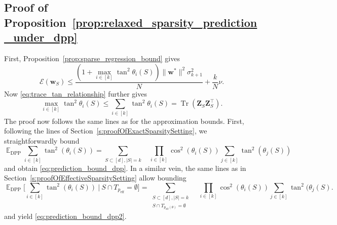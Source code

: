 \documentclass[twoside,11pt]{book}
\numberwithin{theorem}{chapter}
\numberwithin{definition}{chapter}
\numberwithin{proposition}{chapter}
\numberwithin{corollary}{chapter}
\numberwithin{example}{chapter}
\numberwithin{lemma}{chapter}
\numberwithin{assumption}{chapter}
\numberwithin{equation}{chapter}
\numberwithin{figure}{chapter}
\DeclareMathOperator{\Tr}{Tr}
\DeclareMathOperator{\DPP}{\mathrm{DPP}}
\DeclareMathOperator{\eff}{\mathrm{eff}}
\DeclareMathOperator{\Tran}{\intercal}
\DeclareMathOperator{\EX}{\mathbb{E}}
\begin{document}
\subsection{Proof of Proposition~\ref{prop:relaxed_sparsity_prediction_under_dpp}}
First, Proposition~\ref{prop:sparse_regression_bound} gives
\begin{equation}
    	\mathcal{E}(\bm{w}_{S})  \leq \frac{(1+\max\limits_{i \in [k]} \tan^{2}\theta_{i}(S))	\|\bm{w}^{*}\|^{2}\sigma_{k+1}^{2}}{N} + \frac{k}{N}\nu.
\end{equation}
Now \eqref{eq:trace_tan_relationship} further gives
\begin{equation}
	\max\limits_{i \in [k]} \tan^{2}\theta_{i}(S) \leq \sum\limits_{i \in [k]} \tan^{2}\theta_{i}(S) = \Tr(\bm{Z}_{S}^{}\bm{Z}_{S}	^{\Tran}).
\end{equation}
The proof now follows the same lines as for the approximation bounds. First, following the lines of Section~\ref{s:proofOfExactSparsitySetting}, we straightforwardly bound
\begin{equation}
	\EX_{\DPP} \sum\limits_{i \in [k]} \tan^{2}(\theta_{i}(S)) = \sum\limits_{S \subset [d], |S| = k} \quad \prod\limits_{i \in 	[k]} 	\cos^{2}(\theta_{i}(S)) \sum_{j \in [k]}\tan^{2}(\theta_{j}(S))
\end{equation}
and obtain \eqref{eq:prediction_bound_dpp}. In a similar vein, the same lines as in  Section~\ref{s:proofOfEffectiveSparsitySetting} allow bounding
\begin{equation}
	\EX_{\DPP} \bigg[ \sum\limits_{i \in [k]}  \tan^{2}(\theta_{i}(S)) \: | \: S \cap T_{p_{\eff}} = \emptyset \bigg] = 			\sum\limits_{\substack{S \subset [d],|S| = k\\  S \cap T_{p_{\eff}(\theta)} = \emptyset}} \quad \prod\limits_{i \in [k]} 	\cos^{2}	(\theta_{i}(S)) \sum_{j \in [k]}\tan^{2}(\theta_{j}(S).
\end{equation}
and yield \eqref{eq:prediction_bound_dpp2}.

\end{document}
